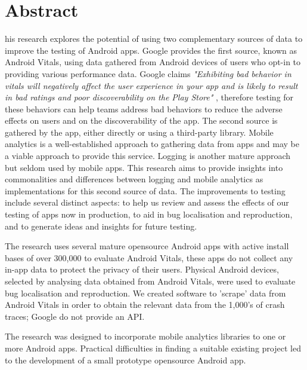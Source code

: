 \chapter*{Abstract}
\begin{SingleSpace}
his research explores the potential of using two complementary sources of data to improve the testing of Android apps. Google provides the first source, known as Android Vitals, using data gathered from Android devices of  users who opt-in to providing various performance data. Google claims \textit{"Exhibiting bad behavior in vitals will negatively affect the user experience in your app and is likely to result in bad ratings and poor discoverability on the Play Store"}%
, therefore testing for these behaviors can help teams address bad behaviors to reduce the adverse effects on users and on the discoverability of the app.
The second source is gathered by the app, either directly or using a third-party library. Mobile analytics is a  well-established approach to gathering data from apps and may be a viable approach to provide this service. Logging is another mature approach but seldom used by mobile apps. This research aims to provide insights into commonalities and differences between logging and mobile analytics as implementations for this second source of data.
The improvements to testing include several distinct aspects: to help us review and assess the effects of our testing of apps now in production, to aid in bug localisation and reproduction, and to generate ideas and insights for future testing.

The research uses several mature opensource Android apps with active install bases of over 300,000 to evaluate Android Vitals, these apps do not collect any in-app data to protect the privacy of their users. Physical Android devices, selected by analysing data obtained from Android Vitals, were used to evaluate bug localisation and reproduction. We created software to 'scrape' data from Android Vitals in order to obtain the relevant data from the 1,000's of crash traces; Google do not provide an API.

The research was designed to incorporate mobile analytics libraries to one or more Android apps. Practical difficulties in finding a suitable existing project led to the development of a small prototype opensource Android app. 


\end{SingleSpace}
